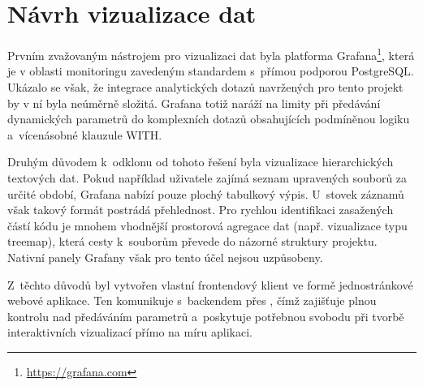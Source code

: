 \section{Návrh vizualizace dat}
\label{sec:design:visualization}


Prvním zvažovaným nástrojem pro vizualizaci dat byla platforma Grafana\footnote{\url{https://grafana.com}}, která je v oblasti monitoringu zavedeným standardem s~přímou podporou PostgreSQL. Ukázalo se však, že integrace analytických \SQL dotazů navržených pro tento projekt by v ní byla neúměrně složitá. Grafana totiž naráží na limity při předávání dynamických parametrů do komplexních dotazů obsahujících podmíněnou logiku a~vícenásobné klauzule WITH.

Druhým důvodem k~odklonu od tohoto řešení byla vizualizace hierarchických textových dat. Pokud například uživatele zajímá seznam upravených souborů za určité období, Grafana nabízí pouze plochý tabulkový výpis. U~stovek záznamů však takový formát postrádá přehlednost. Pro rychlou identifikaci zasažených částí kódu je mnohem vhodnější prostorová agregace dat (např. vizualizace typu treemap), která cesty k~souborům převede do názorné struktury projektu. Nativní panely Grafany však pro tento účel nejsou uzpůsobeny.

Z~těchto důvodů byl vytvořen vlastní frontendový klient ve formě jednostránkové webové aplikace. Ten komunikuje s~backendem přes \REST \API, čímž zajišťuje plnou kontrolu nad předáváním parametrů a~poskytuje potřebnou svobodu při tvorbě interaktivních vizualizací přímo na míru aplikaci.

